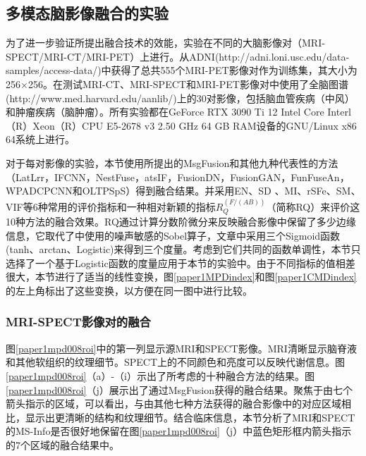 \subsection{多模态脑影像融合的实验}
为了进一步验证所提出融合技术的效能，实验在不同的大脑影像对（MRI-SPECT/MRI-CT/MRI-PET）上进行。从ADNI(http://adni.loni.usc.edu/data-samples/access-data/)中获得了总共555个MRI-PET影像对作为训练集，其大小为256×256。在测试MRI-CT、MRI-SPECT和MRI-PET影像对中使用了全脑图谱 (http://www.med.harvard.edu/aanlib/)上的30对影像，包括脑血管疾病（中风）和肿瘤疾病（脑肿瘤）。所有实验都在GeForce RTX 3090 Ti 12 Intel Core Interl（R）Xeon（R）CPU E5-2678 v3 2.50 GHz 64 GB RAM设备的GNU/Linux x86 64系统上进行。

对于每对影像的实验，本节使用所提出的MsgFusion和其他九种代表性的方法（LatLrr\cite{2018Infrared}，IFCNN\cite{2020IFCNN}，NestFuse\cite{2020NestFuse}，atsIF\cite{2020An}，FusionDN\cite{2020FusionDN}，FusionGAN\cite{2019FusionGAN}，FunFuseAn\cite{kumar2019structural}，WPADCPCNN\cite{panigrahy2020mri}和OLTPSpS\cite{das2022optimized}）得到融合结果。并采用EN\cite{roberts2008assessment}、SD\cite{shi2005wavelet}
、MI\cite{qu2002information}、rSFe\cite{2007A}、SM\cite{Piella2003IP}、VIF\cite{han2013new}等6种常用的评价指标和一种相对新颖的指标$R_{Q}^{(F/(AB))}$（简称RQ）\cite{sengupta2020edge}来评价这10种方法的融合效果。RQ通过计算分数阶微分来反映融合影像中保留了多少边缘信息，它取代了\cite{Xydeas2000Objective}中使用的噪声敏感的Sobel算子，文章中采用三个Sigmoid函数(tanh、arctan、Logistic)来得到三个度量。考虑到它们共同的函数单调性，本节只选择了一个基于Logistic函数的度量应用于本节的实验中。由于不同指标的值相差很大，本节进行了适当的线性变换，图\ref{paper1MPDindex}和图\ref{paper1CMDindex}的左上角标出了这些变换，以方便在同一图中进行比较。

\subsubsection{MRI-SPECT影像对的融合}
图\ref{paper1mpd008roi}中的第一列显示源MRI和SPECT影像。MRI清晰显示脑脊液和其他软组织的纹理细节。SPECT上的不同颜色和亮度可以反映代谢信息。图\ref{paper1mpd008roi}（a）-（i）示出了所考虑的十种融合方法的结果。图\ref{paper1mpd008roi}（j）展示出了通过MsgFusion获得的融合结果。聚焦于由七个箭头指示的区域，可以看出，与由其他七种方法获得的融合影像中的对应区域相比，显示出更清晰的结构和纹理细节。结合临床信息，本节分析了MRI和SPECT的MS-Info是否很好地保留在图\ref{paper1mpd008roi}（j）中蓝色矩形框内箭头指示的7个区域的融合结果中。

